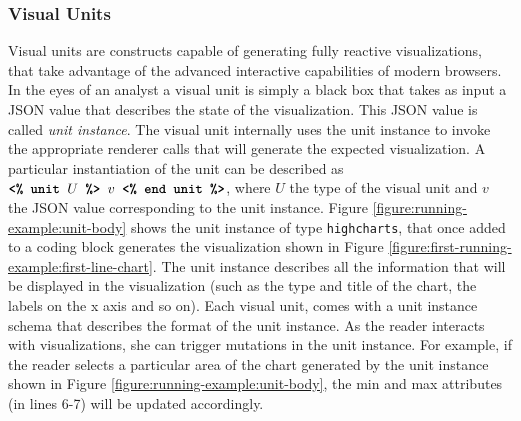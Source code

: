 \subsubsection*{Visual Units}
Visual units are constructs capable of generating fully reactive visualizations, that take advantage of the advanced interactive capabilities of modern browsers. In the eyes of an analyst a visual unit is simply a black box that takes as input a JSON value that describes the state of the visualization. This JSON value is called \emph{unit instance}. The visual unit internally uses the unit instance to invoke the appropriate renderer calls that will generate the expected visualization. A particular instantiation of the unit  can be described as $\texttt{\textbf{<\% unit }} U \texttt{\textbf{ \%> }} v \texttt{\textbf{ <\% end unit \%>}}$, where $U$ the type of the visual unit and $v$ the JSON value corresponding to the unit instance. Figure \ref{figure:running-example:unit-body} shows the unit instance of type \texttt{highcharts}, that once added to a coding block generates the visualization shown in Figure \ref{figure:first-running-example:first-line-chart}. The unit instance describes all the information that will be displayed in the visualization (such as the type and title of the chart, the labels on the x axis and so on). Each visual unit, comes with a unit instance schema that describes the format of the unit instance. As the reader interacts with visualizations, she can trigger mutations in the unit instance. For example, if the reader selects a particular area of the chart generated by the unit instance shown in Figure \ref{figure:running-example:unit-body}, the min and max attributes (in lines 6-7) will be updated accordingly.


